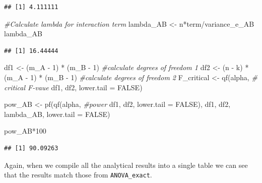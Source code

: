 \documentclass[
]{book}
\newenvironment{Shaded}{\begin{snugshade}}{\end{snugshade}}
\newcommand{\AttributeTok}[1]{\textcolor[rgb]{0.77,0.63,0.00}{#1}}
\newcommand{\CommentTok}[1]{\textcolor[rgb]{0.56,0.35,0.01}{\textit{#1}}}
\newcommand{\ConstantTok}[1]{\textcolor[rgb]{0.00,0.00,0.00}{#1}}
\newcommand{\DecValTok}[1]{\textcolor[rgb]{0.00,0.00,0.81}{#1}}
\newcommand{\FunctionTok}[1]{\textcolor[rgb]{0.00,0.00,0.00}{#1}}
\newcommand{\NormalTok}[1]{#1}
\newcommand{\OtherTok}[1]{\textcolor[rgb]{0.56,0.35,0.01}{#1}}
\newcommand{\SpecialCharTok}[1]{\textcolor[rgb]{0.00,0.00,0.00}{#1}}
\begin{document}
\begin{verbatim}
## [1] 4.111111
\end{verbatim}

\begin{Shaded}
\begin{Highlighting}[]
\CommentTok{\#Calculate lambda for interaction term}
\NormalTok{lambda\_AB }\OtherTok{\textless{}{-}}\NormalTok{ n}\SpecialCharTok{*}\NormalTok{term}\SpecialCharTok{/}\NormalTok{variance\_e\_AB}
\NormalTok{lambda\_AB}
\end{Highlighting}
\end{Shaded}

\begin{verbatim}
## [1] 16.44444
\end{verbatim}

\begin{Shaded}
\begin{Highlighting}[]
\NormalTok{df1 }\OtherTok{\textless{}{-}}\NormalTok{ (m\_A }\SpecialCharTok{{-}} \DecValTok{1}\NormalTok{) }\SpecialCharTok{*}\NormalTok{ (m\_B }\SpecialCharTok{{-}} \DecValTok{1}\NormalTok{)  }\CommentTok{\#calculate degrees of freedom 1}
\NormalTok{df2 }\OtherTok{\textless{}{-}}
\NormalTok{(n }\SpecialCharTok{{-}}\NormalTok{ k) }\SpecialCharTok{*}\NormalTok{ (m\_A }\SpecialCharTok{{-}} \DecValTok{1}\NormalTok{) }\SpecialCharTok{*}\NormalTok{ (m\_B }\SpecialCharTok{{-}} \DecValTok{1}\NormalTok{) }\CommentTok{\#calculate degrees of freedom 2}
\NormalTok{F\_critical }\OtherTok{\textless{}{-}} \FunctionTok{qf}\NormalTok{(alpha, }\CommentTok{\# critical F{-}vaue}
\NormalTok{df1,}
\NormalTok{df2,}
\AttributeTok{lower.tail =} \ConstantTok{FALSE}\NormalTok{)}

\NormalTok{pow\_AB }\OtherTok{\textless{}{-}} \FunctionTok{pf}\NormalTok{(}\FunctionTok{qf}\NormalTok{(alpha, }\CommentTok{\#power}
\NormalTok{df1,}
\NormalTok{df2,}
\AttributeTok{lower.tail =} \ConstantTok{FALSE}\NormalTok{),}
\NormalTok{df1,}
\NormalTok{df2,}
\NormalTok{lambda\_AB,}
\AttributeTok{lower.tail =} \ConstantTok{FALSE}\NormalTok{)}

\NormalTok{pow\_AB}\SpecialCharTok{*}\DecValTok{100}
\end{Highlighting}
\end{Shaded}

\begin{verbatim}
## [1] 90.09263
\end{verbatim}

Again, when we compile all the analytical results into a single table we can see that the results match those from \texttt{ANOVA\_exact}.
\end{document}
